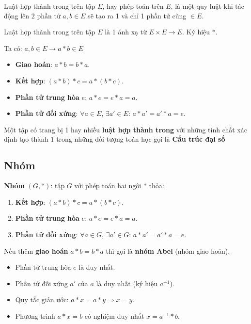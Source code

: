 \documentclass[12pt,a4paper]{article}
\begin{document}
\begin{dinhnghia}
    Luật hợp thành trong trên tập $E$, hay phép toán trên $E$, là một quy luật khi tác động lên 2 phần tử $a, b \in E$ sẽ tạo ra 1 và chỉ 1 phần tử cũng $\in E$.

    Luật hợp thành trong trên tập $E$ là 1 ánh xạ từ $E \times E \to E$. Ký hiệu $*$.

    Ta có: $a, b \in E \to a * b \in E$
\end{dinhnghia}

\begin{tinhchat}[title={Tính chất của luật hợp thành trong}]
  \begin{itemize}
    \item \textbf{Giao hoán}: $a * b = b * a$.
    \item \textbf{Kết hợp}: $(a * b) * c = a * (b * c)$.
    \item \textbf{Phần tử trung hòa} $e$: $a * e = e * a = a$.
    \item \textbf{Phần tử đối xứng}: $\forall a \in E$, $\exists a' \in E$: $a * a' = a' * a = e$.
  \end{itemize}
\end{tinhchat}

\begin{dinhnghia}
    Một tập có trang bị 1 hay nhiều \textbf{luật hợp thành trong} với những tính chất xác định tạo thành 1 trong những đối tượng toán học gọi là \textbf{Cấu trúc đại số}
\end{dinhnghia}

\subsection{Nhóm}

\begin{dinhnghia}
  \textbf{Nhóm} $(G, *)$: tập $G$ với phép toán hai ngôi $*$ thỏa:
  \begin{enumerate}
    \item \textbf{Kết hợp}: $(a * b) * c = a * (b * c)$.
    \item \textbf{Phần tử trung hòa} $e$: $a * e = e * a = a$.
    \item \textbf{Phần tử đối xứng}: $\forall a \in G$, $\exists a' \in G$: $a * a' = a' * a = e$.
  \end{enumerate}
  Nếu thêm \textbf{giao hoán} $a * b = b * a$ thì gọi là \textbf{nhóm Abel} (nhóm giao hoán).
\end{dinhnghia}

\begin{tinhchat}[title={Tính chất của nhóm}]
  \begin{itemize}
    \item Phần tử trung hòa $e$ là duy nhất.
    \item Phần tử đối xứng $a'$ của $a$ là duy nhất (ký hiệu $a^{-1}$).
    \item Quy tắc giản ước: $a * x = a * y \Rightarrow x = y$.
    \item Phương trình $a * x = b$ có nghiệm duy nhất $x = a^{-1} * b$.
  \end{itemize}
\end{tinhchat}
\end{document}
